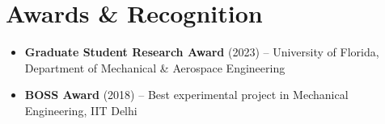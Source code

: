 \documentclass[10pt, letterpaper]{article}
\begin{document}
\section{Awards \& Recognition}

\begin{itemize}[leftmargin=20pt, itemsep=1pt]
    \item \textbf{Graduate Student Research Award} (2023) -- University of Florida, Department of Mechanical \& Aerospace Engineering
    \item \textbf{BOSS Award} (2018) -- Best experimental project in Mechanical Engineering, IIT Delhi
\end{itemize}

    

    
\end{document}
